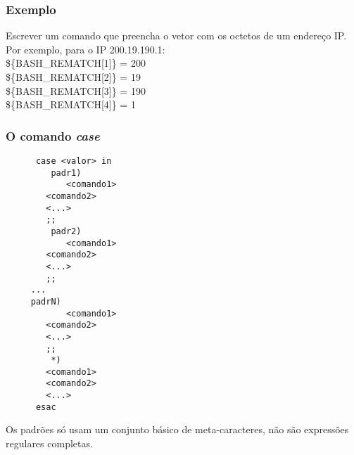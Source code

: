 \documentclass{beamer}
\begin{document}
   \begin{frame}
      \frametitle{Exemplo}
      Escrever um comando que preencha o vetor com os octetos de um endereço IP. \\
      Por exemplo, para o IP 200.19.190.1: \\
      \$\{BASH\_REMATCH[1]\} = 200 \\
      \$\{BASH\_REMATCH[2]\} = 19 \\
      \$\{BASH\_REMATCH[3]\} = 190 \\ 
      \$\{BASH\_REMATCH[4]\} = 1 \\
   \end{frame}
   
   \begin{frame}[fragile]
      \frametitle{O comando \textit{case}}
      \scriptsize
      \begin{verbatim}
      case <valor> in
         padr1)
            <comando1>
	    <comando2>
	    <...>
	    ;;
         padr2)
            <comando1>
	    <comando2>
	    <...>
	    ;;
	 ...
	 padrN)
            <comando1>
	    <comando2>
	    <...>
	    ;;
         *)
	    <comando1>
	    <comando2>
	    <...>
      esac 
      \end{verbatim}
      Os padrões só usam um conjunto básico de meta-caracteres, não são expressões regulares completas.
\end{frame}
\end{document}
